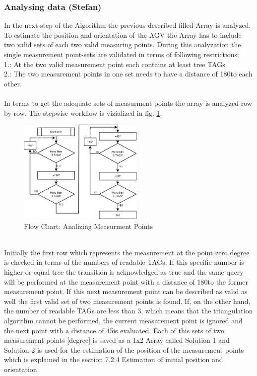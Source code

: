 \subsubsection{Analysing data (Stefan)}
In the next step of the Algorithm the previous described filled Array is analyzed. To estimate the position and orientation of the AGV the Array has to include two valid sets of each two valid measuring points.  During this analyzation the single measurement point-sets are validated in terms of following restrictions:\\
1.: At the two valid measurement point each contains at least tree TAGs\\
2.: The two measurement points in one set needs to have a distance of 180\textdegree  to each other.\\
\\
In terms to get the adequate sets of measurment points the array is analyzed row by row. The stepwise workflow is vizialized in fig. \ref{Analyze_Array}.
\begin{figure}[!htbp]
\centering
\includegraphics[width = 6cm]{Pictures/AnalyzeArray}
\caption{Flow Chart: Analizing Measurment Points}
\label{Analyze_Array}
\end{figure}\\
Initially the first row which represents the measurement at the point zero degree is checked in terms of the numbers of readable TAGs. If this specific number is higher or equal tree the transition is acknowledged as true and the same query will be performed at the measurement point with a distance of 180\textdegree  to the former measurement point. If this next measurement point can be described as valid as well the first valid set of two measurement points is found. If, on the other hand, the number of readable TAGs are less than 3, which means that the triangulation algorithm cannot be performed, the current measurement point is ignored and the next point with a distance of 45\textdegree   is evaluated.
Each of this sets of two measurement points [degree] is saved as a 1x2 Array called Solution 1 and Solution 2 is used for the estimation of the position of the measurement points which is explained in the section 7.2.4 Estimation of initial position and orientation.\\

